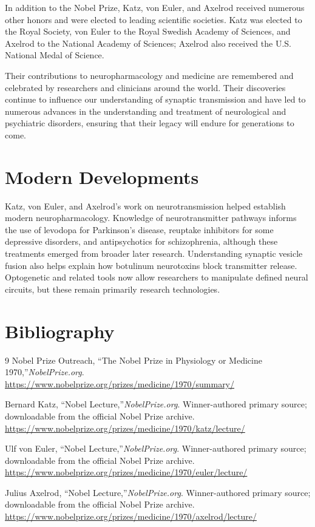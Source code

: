 In addition to the Nobel Prize, Katz, von Euler, and Axelrod received numerous other honors and were elected to leading scientific societies. Katz was elected to the Royal Society, von Euler to the Royal Swedish Academy of Sciences, and Axelrod to the National Academy of Sciences; Axelrod also received the U.S. National Medal of Science.

Their contributions to neuropharmacology and medicine are remembered and celebrated by researchers and clinicians around the world. Their discoveries continue to influence our understanding of synaptic transmission and have led to numerous advances in the understanding and treatment of neurological and psychiatric disorders, ensuring that their legacy will endure for generations to come.


\section{Modern Developments}

Katz, von Euler, and Axelrod's work on neurotransmission helped establish modern neuropharmacology. Knowledge of neurotransmitter pathways informs the use of levodopa for Parkinson's disease, reuptake inhibitors for some depressive disorders, and antipsychotics for schizophrenia, although these treatments emerged from broader later research. Understanding synaptic vesicle fusion also helps explain how botulinum neurotoxins block transmitter release. Optogenetic and related tools now allow researchers to manipulate defined neural circuits, but these remain primarily research technologies.


\section{Bibliography}

\begin{thebibliography}{9}
Nobel Prize Outreach, ``The Nobel Prize in Physiology or Medicine 1970,''\emph{NobelPrize.org}.\\
\url{https://www.nobelprize.org/prizes/medicine/1970/summary/}

Bernard Katz, ``Nobel Lecture,''\emph{NobelPrize.org}. Winner-authored primary source; downloadable from the official Nobel Prize archive.\\
\url{https://www.nobelprize.org/prizes/medicine/1970/katz/lecture/}

Ulf von Euler, ``Nobel Lecture,''\emph{NobelPrize.org}. Winner-authored primary source; downloadable from the official Nobel Prize archive.\\
\url{https://www.nobelprize.org/prizes/medicine/1970/euler/lecture/}

Julius Axelrod, ``Nobel Lecture,''\emph{NobelPrize.org}. Winner-authored primary source; downloadable from the official Nobel Prize archive.\\
\url{https://www.nobelprize.org/prizes/medicine/1970/axelrod/lecture/}
\end{thebibliography}
